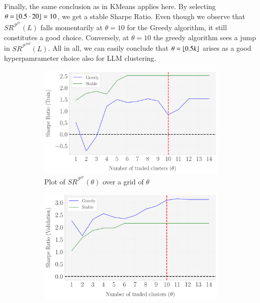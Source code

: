 Finally, the same conclusion as in KMeans applies here. By selecting $\theta=\lfloor 0.5\cdot 20 \rfloor=10$, we get a stable Sharpe Ratio. Even though we observe that $SR^{\mathcal P^{tr}}(L)$ falls momentarily at $\theta=10$ for the Greedy algorithm, it still constitutes a good choice. Conversely, at $\theta=10$ the greedy algorithm sees a jump in $SR^{\mathcal P^{val}}(L)$. All in all, we can easily conclude that $\theta=\lfloor 0.5k \rfloor$ arises as a good hyperpamrameter choice also for LLM clustering.
\begin{figure}[H]
\caption{Sharpe Ratios in the train and validation splits as a function of $\theta$ (LLM)}
  \centering

    \begin{subfigure}[b]{0.46\textwidth}
    \centering
    \includegraphics[width=\textwidth]{LLAMA_RobustnessCheck_SR_Train_Set_vs_Theta_[Change_theta].pdf}
    \caption{Plot of $SR^{\mathcal P^{tr}}(\theta)$ over a grid of $\theta$}
    \label{fig:LLM_hyp_3}
  \end{subfigure}
  \hspace{0.05\textwidth} %
  \begin{subfigure}[b]{0.46\textwidth}
    \centering
    \includegraphics[width=\textwidth]{LLAMA_RobustnessCheck_SR_Validation_Set_vs_Theta_[Change_theta].pdf}

\end{subfigure}
\end{figure}
